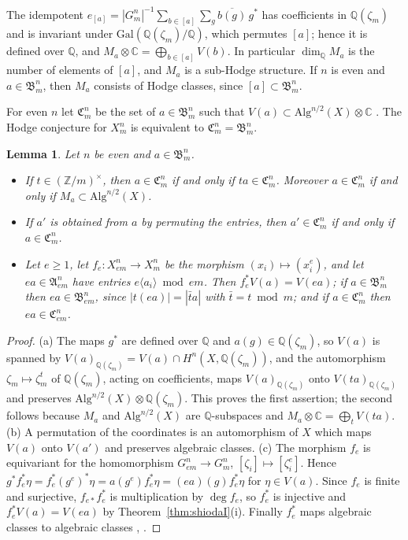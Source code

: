 \documentclass[11pt]{amsart}
\newtheorem{lemma}[theorem]{Lemma}
\theoremstyle{definition}
\theoremstyle{remark}
\numberwithin{equation}{section}
\newcommand{\Q}{\mathbb{Q}}
\newcommand{\C}{\mathbb{C}}
\newcommand{\Z}{\mathbb{Z}}
\newcommand{\fA}{\mathfrak{A}}
\newcommand{\fB}{\mathfrak{B}}
\newcommand{\fC}{\mathfrak{C}}
\begin{document}
The idempotent $e_{[a]}=|G^n_m|^{-1}\sum_{b\in[a]}\sum_{g}\overline{b(g)}\,g^*$ has coefficients in $\Q(\zeta_m)$ and is invariant under $\mathrm{Gal}(\Q(\zeta_m)/\Q)$, which permutes $[a]$; hence it is defined over $\Q$, and $M_a\otimes\C=\bigoplus_{b\in[a]}V(b)$. In particular $\dim_\Q M_a$ is the number of elements of $[a]$, and $M_a$ is a sub-Hodge structure. If $n$ is even and $a\in\fB^n_m$, then $M_a$ consists of Hodge classes, since $[a]\subset\fB^n_m$.

For even $n$ let $\fC^n_m$ be the set of $a\in\fB^n_m$ such that $V(a)\subset\mathrm{Alg}^{n/2}(X)\otimes\C$ \cite[p.~177]{Sh79}. The Hodge conjecture for $X^n_m$ is equivalent to $\fC^n_m=\fB^n_m$.

\begin{lemma}\label{lem:basic}
Let $n$ be even and $a\in\fB^n_m$.
\begin{itemize}
\item[(a)] If $t\in(\Z/m)^\times$, then $a\in\fC^n_m$ if and only if $ta\in\fC^n_m$. Moreover $a\in\fC^n_m$ if and only if $M_a\subset\mathrm{Alg}^{n/2}(X)$.
\item[(b)] If $a'$ is obtained from $a$ by permuting the entries, then $a'\in\fC^n_m$ if and only if $a\in\fC^n_m$.
\item[(c)] Let $e\ge1$, let $f_e\colon X^n_{em}\to X^n_m$ be the morphism $(x_i)\mapsto(x_i^e)$, and let $ea\in\fA^n_{em}$ have entries $e\langle a_i\rangle\bmod em$. Then $f_e^*V(a)=V(ea)$; if $a\in\fB^n_m$ then $ea\in\fB^n_{em}$, since $|t(ea)|=|\bar t a|$ with $\bar t=t\bmod m$; and if $a\in\fC^n_m$ then $ea\in\fC^n_{em}$.
\end{itemize}
\end{lemma}

\begin{proof}
(a) The maps $g^*$ are defined over $\Q$ and $a(g)\in\Q(\zeta_m)$, so $V(a)$ is spanned by $V(a)_{\Q(\zeta_m)}=V(a)\cap H^n(X,\Q(\zeta_m))$, and the automorphism $\zeta_m\mapsto\zeta_m^t$ of $\Q(\zeta_m)$, acting on coefficients, maps $V(a)_{\Q(\zeta_m)}$ onto $V(ta)_{\Q(\zeta_m)}$ and preserves $\mathrm{Alg}^{n/2}(X)\otimes\Q(\zeta_m)$. This proves the first assertion; the second follows because $M_a$ and $\mathrm{Alg}^{n/2}(X)$ are $\Q$-subspaces and $M_a\otimes\C=\bigoplus_tV(ta)$.
(b) A permutation of the coordinates is an automorphism of $X$ which maps $V(a)$ onto $V(a')$ and preserves algebraic classes.
(c) The morphism $f_e$ is equivariant for the homomorphism $G^n_{em}\to G^n_m$, $[\zeta_i]\mapsto[\zeta_i^e]$. Hence $g^*f_e^*\eta=f_e^*(g^e)^*\eta=a(g^e)f_e^*\eta=(ea)(g)f_e^*\eta$ for $\eta\in V(a)$. Since $f_e$ is finite and surjective, $f_{e*}f_e^*$ is multiplication by $\deg f_e$, so $f_e^*$ is injective and $f_e^*V(a)=V(ea)$ by Theorem~\ref{thm:shiodaI}(i). Finally $f_e^*$ maps algebraic classes to algebraic classes \cite{BH61}, \cite[Ch.~19]{Fu98}.
\end{proof}
\end{document}
